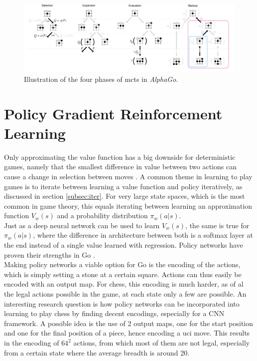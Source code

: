 \begin{figure}
\includegraphics[width=\linewidth]{fig/alphago_mcts}
\caption[AlphaGo]{Illustration of the four phases of \gls{mcts} in \textit{AlphaGo}.}
\label{fig:alphago}
\end{figure}

\section{Policy Gradient Reinforcement Learning}
\label{sec:polnet}
Only approximating the value function has a big downside for deterministic games, namely that the smallest difference in value between two actions can cause a change in selection between moves \cite{sutton00}.
A common theme in learning to play games is to iterate between learning a value function and policy iteratively, as discussed in section \ref{subsec:iter}. For very large state spaces, which is the most common in game theory, this equals iterating between learning an approximation function $V_w(s)$ and a probability distribution $\pi_w(a|s)$. \\
Just as a deep neural network can be used to learn $V_w(s)$, the same is true for $\pi_w(a|s)$, where the difference in architecture between both is a softmax layer at the end instead of a single value learned with regression. Policy networks have proven their strengths in Go \cite{alphago16}.\\

Making policy networks a viable option for Go is the encoding of the actions, which is simply setting a stone at a certain square. Actions can thus easily be encoded with an output map. For chess, this encoding is much harder, as of al the legal actions possible in the game, at each state only a few are possible. An interesting research question is how policy networks can be incorporated into learning to play chess by finding decent encodings, especially for a CNN framework. A possible idea is the use of 2 output maps, one for the start position and one for the final position of a piece, hence encoding a uci move. This results in the encoding of $64^2$ actions, from which most of them are not legal, especially from a certain state where the average breadth is around 20. \\

